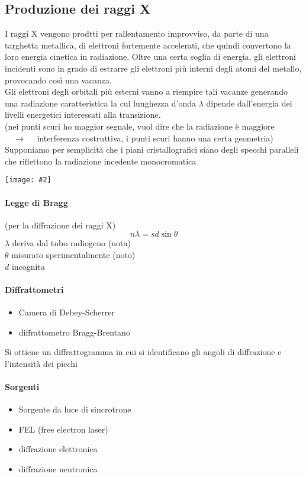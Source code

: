 \documentclass{article}
\newcommand{\so}{\quad \rightarrow \quad}
\newcommand{\img}[2]
{
\begin{center}
    \texttt{[image: \#2]}
\end{center}
}
\begin{document}
\subsection{Produzione dei raggi X}
I raggi X vengono prodtti per rallentamento improvviso, da parte di una targhetta metallica, di elettroni fortemente accelerati, che quindi convertono la loro energia cinetica in radiazione. Oltre una certa soglia di energia, gli elettroni incidenti sono in grado di estrarre gli elettroni più interni degli atomi del metallo, provocando così una vacanza.\\
Gli elettroni degli orbitali più esterni vanno a riempire tali vacanze generando una radiazione caratteristica la cui lunghezza d'onda $\lambda$ dipende dall'energia dei livelli energetici interessati alla transizione.
\\
(nei punti scuri ho maggior segnale, vuol dire che la radiazione è maggiore $\so$ interferenza costruttiva, i punti scuri hanno una certa geometria)\\
Supponiamo per semplicità che i piani cristallografici siano degli specchi paralleli che riflettono la radiazione incedente monocromatica
\img{13}{rad.png}


\paragraph{Legge di Bragg} (per la diffrazione dei raggi X)
\begin{equation*}
    n\lambda=sd\sin\theta
\end{equation*}
$\lambda$ deriva dal tubo radiogeno (nota)\\
$\theta$ misurato sperimentalmente (noto) \\
$d$ incognita

\paragraph{Diffrattometri}
\begin{itemize}
    \item Camera di Debey-Scherrer
    \item diffrattometro Bragg-Brentano
\end{itemize}
Si ottiene un diffrattogramma in cui si identificano gli angoli di diffrazione e l'intensità dei picchi

\paragraph{Sorgenti}
\begin{itemize}
    \item Sorgente da luce di sincrotrone
    \item FEL (free electron laser)
    \item diffrazione elettronica
    \item diffrazione neutronica
\end{itemize}


\clearpage
\printglossary[title=Glossario]
\end{document}
